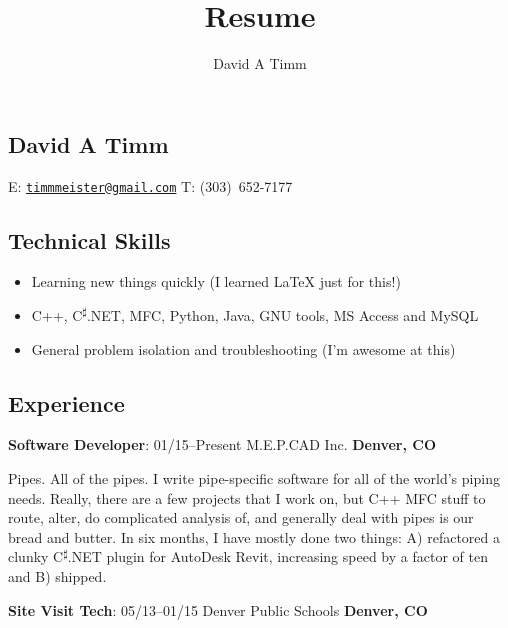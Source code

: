 \documentclass[letterpaper,12pt]{article}
\author{David A Timm}
\title{Resume}
\begin{document}
\begin{center}
\section{David A Timm}

E: \href{mailto:timmmeister@gmail.com?subject=You%27re%20hired!}
{\nolinkurl{timmmeister@gmail.com}}
T: \mbox{(303) 652-7177}
\end{center}

\begin{center}
\subsection{Technical Skills}
\end{center}

\begin{itemize}
\item Learning new things quickly (I learned \LaTeX{} just for this!)
\item C++, C\textsuperscript{{$\sharp$}}.NET, MFC, Python, Java, GNU tools, MS Access and MySQL
\item General problem isolation and troubleshooting (I'm awesome at this)
\end{itemize}

\begin{center}
\subsection{Experience}
\end{center}

\begin{flushleft}
\textbf{Software Developer}: 01/15--Present M.E.P.CAD Inc.
\textbf{Denver, CO}
\end{flushleft}

Pipes. All of the pipes. I write pipe-specific software for all of the world's
piping needs. Really, there are a few projects that I work on, but C++ MFC
stuff to route, alter, do complicated analysis of, and generally deal with
pipes is our bread and butter. In six months, I have mostly done two things:
A) refactored a clunky C\textsuperscript{{$\sharp$}}.NET plugin for AutoDesk Revit,
increasing speed by a factor of ten and B) shipped.

\begin{flushleft}
\textbf{Site Visit Tech}: 05/13--01/15 Denver Public Schools
\textbf{Denver, CO}
\end{flushleft}
\end{document}
